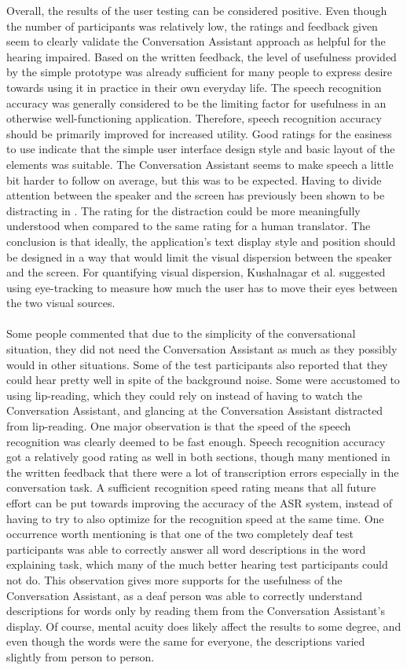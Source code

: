 \documentclass[english, 12pt, a4paper, pdftex, elec, utf8]{aaltothesis}
\begin{document}
Overall, the results of the user testing can be considered positive. Even though the number of participants was relatively low, the ratings and feedback given seem to clearly validate the Conversation Assistant approach as helpful for the hearing impaired. Based on the written feedback, the level of usefulness provided by the simple prototype was already sufficient for many people to express desire towards using it in practice in their own everyday life. The speech recognition accuracy was generally considered to be the limiting factor for usefulness in an otherwise well-functioning application. Therefore, speech recognition accuracy should be primarily improved for increased utility. Good ratings for the easiness to use indicate that the simple user interface design style and basic layout of the elements was suitable. The Conversation Assistant seems to make speech a little bit harder to follow on average, but this was to be expected. Having to divide attention between the speaker and the screen has previously been shown to be distracting in \cite{kushalnagar2015tracked}. The rating for the distraction could be more meaningfully understood when compared to the same rating for a human translator. The conclusion is that ideally, the application's text display style and position should be designed in a way that would limit the visual dispersion between the speaker and the screen. For quantifying visual dispersion, Kushalnagar et al. suggested using eye-tracking to measure how much the user has to move their eyes between the two visual sources. \\\\ 
Some people commented that due to the simplicity of the conversational situation, they did not need the Conversation Assistant as much as they possibly would in other situations. Some of the test participants also reported that they could hear pretty well in spite of the background noise. Some were accustomed to using lip-reading, which they could rely on instead of having to watch the Conversation Assistant, and glancing at the Conversation Assistant distracted from lip-reading. One major observation is that the speed of the speech recognition was clearly deemed to be fast enough. Speech recognition accuracy got a relatively good rating as well in both sections, though many mentioned in the written feedback that there were a lot of transcription errors especially in the conversation task. A sufficient recognition speed rating means that all future effort can be put towards improving the accuracy of the ASR system, instead of having to try to also optimize for the recognition speed at the same time. One occurrence worth mentioning is that one of the two completely deaf test participants was able to correctly answer all word descriptions in the word explaining task, which many of the much better hearing test participants could not do. This observation gives more supports for the usefulness of the Conversation Assistant, as a deaf person was able to correctly understand descriptions for words only by reading them from the Conversation Assistant's display. Of course, mental acuity does likely affect the results to some degree, and even though the words were the same for everyone, the descriptions varied slightly from person to person. \\\\
\end{document}
